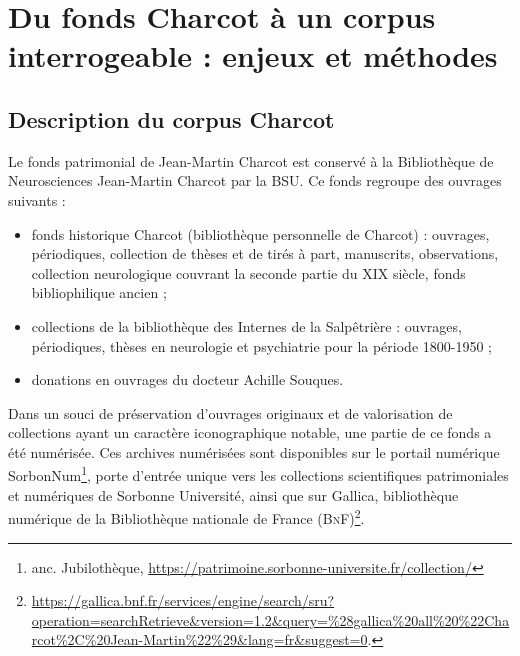 \section{Du fonds Charcot à un corpus interrogeable : enjeux et méthodes}
\subsection{Description du corpus Charcot}
\label{corpus}
Le fonds patrimonial de Jean-Martin Charcot est conservé à la Bibliothèque de Neurosciences Jean-Martin Charcot par la BSU.
 Ce fonds regroupe des ouvrages suivants : 
\begin{itemize}
\item fonds historique Charcot (bibliothèque personnelle de Charcot) : ouvrages, périodiques, collection de thèses et de tirés à part, manuscrits, observations, collection neurologique couvrant la seconde partie du XIX\ieme{} siècle, fonds bibliophilique ancien ;
\item collections de la bibliothèque des Internes de la Salpêtrière : ouvrages, périodiques, thèses en neurologie et psychiatrie pour la période 1800-1950 ;
\item donations en ouvrages du docteur Achille Souques.
\end{itemize}
\medskip
Dans un souci de préservation d'ouvrages originaux et de valorisation de collections ayant un caractère iconographique notable, une partie de ce fonds a été numérisée. Ces archives numérisées sont disponibles sur le portail numérique
SorbonNum\footnote{anc. Jubilothèque, \url{https://patrimoine.sorbonne-universite.fr/collection/}}, porte d'entrée unique vers les collections scientifiques patrimoniales et numériques de Sorbonne Université, ainsi que sur Gallica, bibliothèque numérique de la Bibliothèque nationale de France (\textsc{BnF})\footnote{\url{https://gallica.bnf.fr/services/engine/search/sru?operation=searchRetrieve&version=1.2&query=\%28gallica\%20all\%20\%22Charcot\%2C\%20Jean-Martin\%22\%29&lang=fr&suggest=0}.}.

